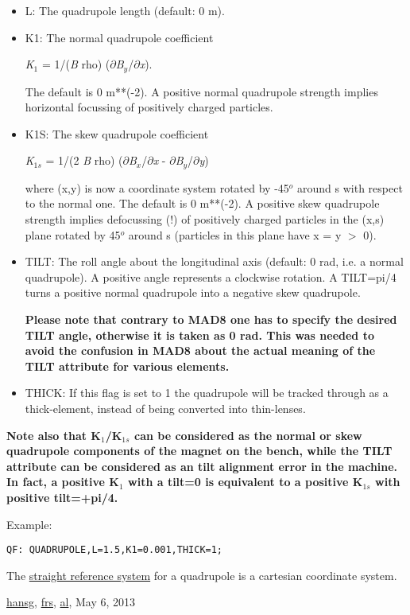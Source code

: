 \begin{itemize}
	\item L: The quadrupole length (default: 0 m). 
	\item K1: The normal quadrupole coefficient         

\textit{K}$_1$ = 1/(\textit{B} rho) ($\partial$\textit{B$_y$}/$\partial$\textit{x}). 

 The default is 0 m**(-2). A positive normal quadrupole           strength implies horizontal focussing of positively charged           particles. 
	\item K1S: The skew quadrupole coefficient         

\textit{K}$_{1s}$ = 1/(2 \textit{B} rho) ($\partial$\textit{B$_x$}/$\partial$\textit{x} - $\partial$\textit{B$_y$}/$\partial$\textit{y}) 

 where (x,y) is now a coordinate system rotated by -45$^o$           around s with respect to the normal one. The default is 0           m**(-2). A positive skew quadrupole strength implies           defocussing (!) of positively charged particles in the (x,s)           plane rotated by 45$^o$ around s (particles in this           plane have x = y $>$ 0). 
	\item TILT: The roll angle about the longitudinal axis (default: 0         rad, i.e. a normal quadrupole). A positive angle represents a         clockwise rotation. A TILT=pi/4 turns a positive normal         quadrupole into a negative skew quadrupole.         

\textbf{ Please note that contrary to MAD8               one has to specify the desired TILT angle, otherwise it is               taken as 0 rad. This was needed to avoid the confusion in               MAD8 about the actual meaning of the TILT attribute for               various elements. }
	\item THICK: If this flag is set to 1 the quadrupole will be tracked         through as a thick-element, instead of being converted into         thin-lenses. 
\end{itemize}

\textbf{ Note also that K$_1$/K$_{1s}$           can be considered as the normal or skew quadrupole components           of the magnet on the bench, while the TILT attribute can be           considered as an tilt alignment error in the machine. In fact,           a positive K$_1$ with a tilt=0 is equivalent to a           positive K$_{1s}$ with positive tilt=+pi/4. }

Example: 
\begin{verbatim}
QF: QUADRUPOLE,L=1.5,K1=0.001,THICK=1;
\end{verbatim}     The \href{local_system.html#straight}{straight reference system}     for a quadrupole is a cartesian coordinate system.     

\href{http://www.cern.ch/Hans.Grote/hansg_sign.html}{hansg},       \href{http://www.cern.ch/Frank.Schmidt/frs_sign.html}{frs},       \href{https://phonebook.cern.ch/phonebook/?id=PE525753}{al},       May 6, 2013 

